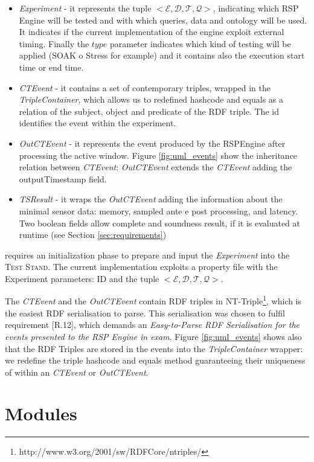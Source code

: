 \begin{itemize}
\item \textit{Experiment} - it represents the tuple $<\mathcal{E}, \mathcal{D},\mathcal{T},\mathcal{Q}>$, indicating which RSP Engine will be tested and with which queries, data and ontology will be used. It indicates if the current implementation of the engine exploit external timing. Finally the $type$ parameter indicates which kind of testing will be applied (SOAK o Stress for example) and it contains also the execution start time or end time.
\item \textit{CTEvent} - it contains a set of contemporary triples, wrapped in the \textit{TripleContainer}, which allows us to redefined hashcode and equals as a relation of the subject, object and predicate of the RDF triple. The id identifies the event within the experiment.
\item \textit{OutCTEvent} - it represents the event produced by the RSPEngine after processing the active window. Figure \ref{fig:uml_events} show the inheritance relation between \textit{CTEvent}:  \textit{OutCTEvent} extends the \textit{CTEvent} adding the outputTimestamp field.
\item \textit{TSResult} - it wraps the \textit{OutCTEvent} adding the information about the minimal sensor data: memory, sampled ante e post processing, and latency. Two boolean fields allow complete and soundness result, if it is evaluated at runtime (see Section \ref{sec:requirements})
\end{itemize}

\name requires an initialization phase to prepare and input the \textit{Experiment} into the \textsc{Test Stand}. The current implementation exploits a property file with the Experiment parameters: ID and the tuple $<\mathcal{E}, \mathcal{D},\mathcal{T},\mathcal{Q}>$. 

The \textit{CTEvent} and the \textit{OutCTEvent} contain RDF triples in NT-Triple\footnote{http://www.w3.org/2001/sw/RDFCore/ntriples/}, which is the easiest RDF serialisation to parse. This serialisation was chosen to fulfil requirement [R.12], which demands an \textit{Easy-to-Parse RDF Serialisation for the events presented to the RSP Engine in exam}. Figure \ref{fig:uml_events} shows also that the RDF Triples are stored in the events into the \textit{TripleContainer} wrapper: we redefine the triple hashcode and equals method guaranteeing their uniqueness of within an \textit{CTEvent} or \textit{OutCTEvent}.

\section{Modules}\label{sec:modules-impl}

